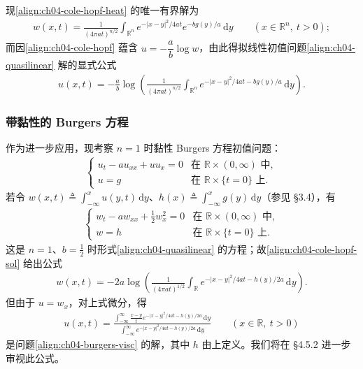 \documentclass[../../main.tex]{subfiles}
\begin{document}
现\eqref{align:ch04-cole-hopf-heat} 的唯一有界解为
\begin{align*}
w(x,t)=\frac{1}{(4\pi at)^{n/2}}\int_{\mathbb{R}^n}e^{-|x-y|^2/4at}e^{-bg(y)/a}\,\mathrm{d}y \qquad(x\in\mathbb{R}^n,\ t>0);
\end{align*}
而因\eqref{align:ch04-cole-hopf} 蕴含 $u=-\dfrac{a}{b}\log w$，由此得拟线性初值问题\eqref{align:ch04-quasilinear} 解的显式公式
\begin{align}\label{align:ch04-cole-hopf-sol}
u(x,t)=-\frac{a}{b}\log\!\left(\frac{1}{(4\pi at)^{n/2}}\int_{\mathbb{R}^n}e^{-|x-y|^2/4at-bg(y)/a}\,\mathrm{d}y\right).
\end{align}

\subsubsection{带黏性的 Burgers 方程}

作为进一步应用，现考察 $n=1$ 时黏性 Burgers 方程初值问题：
\begin{align}\label{align:ch04-burgers-visc}
\begin{cases}
u_t-au_{xx}+uu_x=0 & \text{在 }\mathbb{R}\times(0,\infty)\text{ 中},\\
u=g & \text{在 }\mathbb{R}\times\{t=0\}\text{ 上}.
\end{cases}
\end{align}
若令 $w(x,t)\triangleq\int_{-\infty}^x u(y,t)\,\mathrm{d}y$、$h(x)\triangleq\int_{-\infty}^x g(y)\,\mathrm{d}y$（参见 \S3.4），有
\begin{align}\label{align:ch04-burgers-pot}
\begin{cases}
w_t-aw_{xx}+\frac{1}{2}w_x^2=0 & \text{在 }\mathbb{R}\times(0,\infty)\text{ 中},\\
w=h & \text{在 }\mathbb{R}\times\{t=0\}\text{ 上}.
\end{cases}
\end{align}
这是 $n=1$、$b=\tfrac{1}{2}$ 时形式\eqref{align:ch04-quasilinear} 的方程；故\eqref{align:ch04-cole-hopf-sol} 给出公式
\begin{align*}
w(x,t)=-2a\log\!\left(\frac{1}{(4\pi at)^{1/2}}\int_{\mathbb{R}}e^{-|x-y|^2/4at-h(y)/2a}\,\mathrm{d}y\right).
\end{align*}
但由于 $u=w_x$，对上式微分，得
\begin{align}\label{align:ch04-burgers-sol}
u(x,t)=\frac{\displaystyle\int_{-\infty}^\infty\frac{x-y}{t}e^{-|x-y|^2/4at-h(y)/2a}\,\mathrm{d}y}{\displaystyle\int_{-\infty}^\infty e^{-|x-y|^2/4at-h(y)/2a}\,\mathrm{d}y} \qquad(x\in\mathbb{R},\ t>0)
\end{align}
是问题\eqref{align:ch04-burgers-visc} 的解，其中 $h$ 由上定义。我们将在 \S4.5.2 进一步审视此公式。
\end{document}
